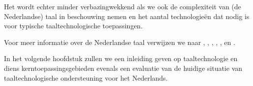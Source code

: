 \documentclass[]{../../metanetpaper}
\begin{document}
\begin{multicols}{2}

    Het wordt echter minder verbazingwekkend als we ook de complexiteit van (de Nederlandse) taal in beschouwing nemen en het aantal technologie{\"e}n dat nodig is voor typische taaltechnologische toepassingen. 

    Voor meer informatie over de Nederlandse taal verwijzen we naar \cite{e-ans}, \cite{TUFenW}, \cite{NedWiki:Fries}, \cite{NedWiki:Nederlands}, \cite{NedWiki:Nedersaksisch},  \cite{Ethn-Dutch} en \cite{Ethn-LN}.

\nocite{Soria:Mariani:2011} \nocite{Joscelyne:Lockwood:2003}

In het volgende hoofdstuk zullen we een inleiding geven op taaltechnologie en diens kerntoepassingsgebieden evenals een evaluatie van de huidige situatie van taaltechnologische ondersteuning voor het Nederlands.


\end{multicols}

\clearpage


\end{document}
